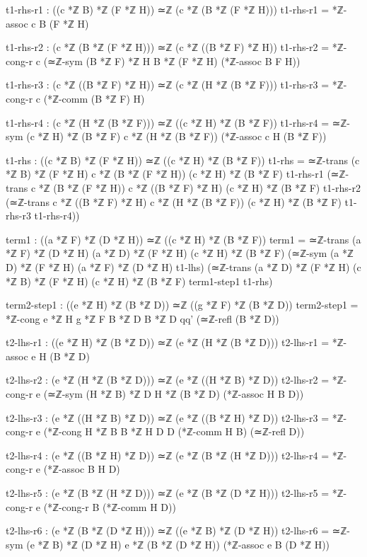 \documentclass[11pt,a4paper]{book}
\begin{document}
\begin{code}
    t1-rhs-r1 : ((c *ℤ B) *ℤ (F *ℤ H)) ≃ℤ (c *ℤ (B *ℤ (F *ℤ H)))
    t1-rhs-r1 = *ℤ-assoc c B (F *ℤ H)
    
    t1-rhs-r2 : (c *ℤ (B *ℤ (F *ℤ H))) ≃ℤ (c *ℤ ((B *ℤ F) *ℤ H))
    t1-rhs-r2 = *ℤ-cong-r c (≃ℤ-sym {(B *ℤ F) *ℤ H} {B *ℤ (F *ℤ H)} (*ℤ-assoc B F H))
    
    t1-rhs-r3 : (c *ℤ ((B *ℤ F) *ℤ H)) ≃ℤ (c *ℤ (H *ℤ (B *ℤ F)))
    t1-rhs-r3 = *ℤ-cong-r c (*ℤ-comm (B *ℤ F) H)
    
    t1-rhs-r4 : (c *ℤ (H *ℤ (B *ℤ F))) ≃ℤ ((c *ℤ H) *ℤ (B *ℤ F))
    t1-rhs-r4 = ≃ℤ-sym {(c *ℤ H) *ℤ (B *ℤ F)} {c *ℤ (H *ℤ (B *ℤ F))} (*ℤ-assoc c H (B *ℤ F))
    
    t1-rhs : ((c *ℤ B) *ℤ (F *ℤ H)) ≃ℤ ((c *ℤ H) *ℤ (B *ℤ F))
    t1-rhs = ≃ℤ-trans {(c *ℤ B) *ℤ (F *ℤ H)} {c *ℤ (B *ℤ (F *ℤ H))} {(c *ℤ H) *ℤ (B *ℤ F)} t1-rhs-r1
             (≃ℤ-trans {c *ℤ (B *ℤ (F *ℤ H))} {c *ℤ ((B *ℤ F) *ℤ H)} {(c *ℤ H) *ℤ (B *ℤ F)} t1-rhs-r2
             (≃ℤ-trans {c *ℤ ((B *ℤ F) *ℤ H)} {c *ℤ (H *ℤ (B *ℤ F))} {(c *ℤ H) *ℤ (B *ℤ F)} t1-rhs-r3 t1-rhs-r4))

    term1 : ((a *ℤ F) *ℤ (D *ℤ H)) ≃ℤ ((c *ℤ H) *ℤ (B *ℤ F))
    term1 = ≃ℤ-trans {(a *ℤ F) *ℤ (D *ℤ H)} {(a *ℤ D) *ℤ (F *ℤ H)} {(c *ℤ H) *ℤ (B *ℤ F)}
              (≃ℤ-sym {(a *ℤ D) *ℤ (F *ℤ H)} {(a *ℤ F) *ℤ (D *ℤ H)} t1-lhs)
              (≃ℤ-trans {(a *ℤ D) *ℤ (F *ℤ H)} {(c *ℤ B) *ℤ (F *ℤ H)} {(c *ℤ H) *ℤ (B *ℤ F)} term1-step1 t1-rhs)

    term2-step1 : ((e *ℤ H) *ℤ (B *ℤ D)) ≃ℤ ((g *ℤ F) *ℤ (B *ℤ D))
    term2-step1 = *ℤ-cong {e *ℤ H} {g *ℤ F} {B *ℤ D} {B *ℤ D} qq' (≃ℤ-refl (B *ℤ D))
    
    t2-lhs-r1 : ((e *ℤ H) *ℤ (B *ℤ D)) ≃ℤ (e *ℤ (H *ℤ (B *ℤ D)))
    t2-lhs-r1 = *ℤ-assoc e H (B *ℤ D)
    
    t2-lhs-r2 : (e *ℤ (H *ℤ (B *ℤ D))) ≃ℤ (e *ℤ ((H *ℤ B) *ℤ D))
    t2-lhs-r2 = *ℤ-cong-r e (≃ℤ-sym {(H *ℤ B) *ℤ D} {H *ℤ (B *ℤ D)} (*ℤ-assoc H B D))
    
    t2-lhs-r3 : (e *ℤ ((H *ℤ B) *ℤ D)) ≃ℤ (e *ℤ ((B *ℤ H) *ℤ D))
    t2-lhs-r3 = *ℤ-cong-r e (*ℤ-cong {H *ℤ B} {B *ℤ H} {D} {D} (*ℤ-comm H B) (≃ℤ-refl D))
    
    t2-lhs-r4 : (e *ℤ ((B *ℤ H) *ℤ D)) ≃ℤ (e *ℤ (B *ℤ (H *ℤ D)))
    t2-lhs-r4 = *ℤ-cong-r e (*ℤ-assoc B H D)
    
    t2-lhs-r5 : (e *ℤ (B *ℤ (H *ℤ D))) ≃ℤ (e *ℤ (B *ℤ (D *ℤ H)))
    t2-lhs-r5 = *ℤ-cong-r e (*ℤ-cong-r B (*ℤ-comm H D))

    t2-lhs-r6 : (e *ℤ (B *ℤ (D *ℤ H))) ≃ℤ ((e *ℤ B) *ℤ (D *ℤ H))
    t2-lhs-r6 = ≃ℤ-sym {(e *ℤ B) *ℤ (D *ℤ H)} {e *ℤ (B *ℤ (D *ℤ H))} (*ℤ-assoc e B (D *ℤ H))
    

\end{code}
\end{document}
